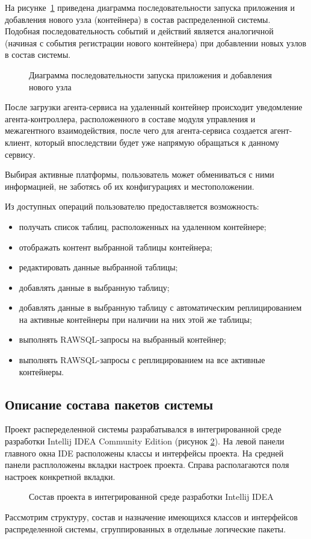 	На рисунке~\ref{3:seq-launch} приведена диаграмма последовательности запуска приложения и добавления нового узла (контейнера) в состав распределенной системы. Подобная последовательность событий и действий является аналогичной (начиная с события регистрации нового контейнера) при добавлении новых узлов в состав системы.

\begin{figure}[h!]
\caption{Диаграмма последовательности запуска приложения и добавления нового узла}
\label{3:seq-launch}
\end{figure}

После загрузки агента-сервиса на удаленный контейнер происходит уведомление агента-контроллера, расположенного в составе модуля управления и  межагентного взаимодействия, после чего для агента-сервиса создается агент-клиент, который впоследствии будет уже напрямую обращаться к данному сервису.

Выбирая активные платформы, пользователь может обмениваться с ними информацией, не заботясь об их конфигурациях и местоположении.

Из доступных операций пользователю предоставляется возможность:
\begin{itemize}
\item получать список таблиц, расположенных на удаленном контейнере;
\item отображать контент выбранной таблицы контейнера;
\item редактировать данные выбранной таблицы;
\item добавлять данные в выбранную таблицу;
\item добавлять данные в выбранную таблицу с автоматическим реплицированием на активные контейнеры при наличии на них этой же таблицы;
\item выполнять RAWSQL-запросы на выбранный контейнер;
\item выполнять RAWSQL-запросы с реплицированием на все активные контейнеры.
\end{itemize}

\subsection{Описание состава пакетов системы}
Проект распеределенной системы разрабатывался в интегрированной среде разработки Intellij IDEA Community Edition (рисунок \ref{3:ide}). На левой панели главного окна IDE расположены классы и интерфейсы проекта. На средней панели расплоложены вкладки настроек проекта. Справа располагаются поля настроек конкретной вкладки.
\begin{figure}[h!]
\caption{Состав проекта в интегрированной среде разработки Intellij IDEA}
\label{3:ide}
\end{figure}
Рассмотрим структуру, состав и назначение имеющихся классов и интерфейсов распределенной системы, сгруппированных в отдельные логические пакеты.

